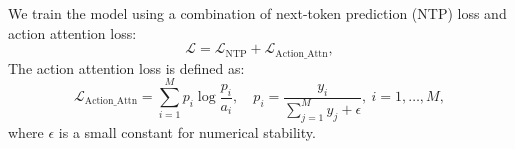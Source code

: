 \documentclass{article}
\begin{document}


We train the model using a combination of next-token prediction (NTP) loss and action attention loss:
\begin{equation}
\mathcal{L} = \mathcal{L}_{\text{NTP}} + \mathcal{L}_{\text{Action\_Attn}},
\end{equation}
The action attention loss is defined as:
\begin{equation}
\mathcal{L}_{\text{Action\_Attn}} = \sum_{i=1}^M p_i \log \frac{p_i}{a_i}, \quad p_i = \frac{y_i}{\sum_{j=1}^M y_j + \epsilon}, ~i = 1, \dots, M,
\end{equation}
where $\epsilon$ is a small constant for numerical stability.
\end{document}
